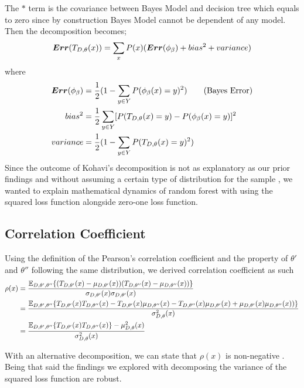 The $*$ term is the covariance between Bayes Model and decision tree which equals to zero since by construction Bayes Model cannot be dependent of any model. Then the decomposition becomes;
\begin{align}
\boldsymbol{Err}(T_{D, \theta}(x)) = \sum_{x} P(x)(\boldsymbol{Err}(\phi_{\beta}) + bias^2 + variance) \notag
\end{align}
where
\begin{align}
\boldsymbol{Err}(\phi_{\beta}) & = \dfrac{1}{2}(1 - \sum_{y \in Y}P(\phi_{\beta}(x) = y)^2)\tag{Bayes Error} \\
bias^2 & = \dfrac{1}{2}\sum_{y \in Y} [P(T_{D,\theta}(x)=y) - P(\phi_{\beta}(x) = y)]^2\notag \\
variance & = \dfrac{1}{2}(1 - \sum_{y \in Y}P(T_{D, \theta}(x) = y)^2) \notag
\end{align}
Since the outcome of Kohavi's decomposition is not as explanatory as our prior findings and without assuming a certain type of distribution for the sample \cite{louppe2014understanding}, we wanted to explain mathematical dynamics of random forest with using the squared loss function alongside zero-one loss function.

\subsection{Correlation Coefficient}
\label{app:corr_coef}
Using the definition of the Pearson's correlation coefficient and the property of $\theta'$ and $\theta''$ following the same distribution, we derived correlation coefficient as such
\begin{align}
\rho(x) & = \dfrac{\mathbb{E}_{D,\theta',\theta''}\{(T_{D,\theta'}(x) - \mu_{D,\theta'}(x))(T_{D,\theta''}(x) - \mu_{D,\theta''}(x))\} }				{\sigma_{D,\theta'}(x)\sigma_{D,\theta'}(x)}\notag \\
		& = \dfrac{\mathbb{E}_{D,\theta',\theta''}\{T_{D,\theta'}(x)T_{D,\theta''}(x) - T_{D,\theta'}(x)\mu_{D,\theta''}(x) - T_{D,								\theta''}(x)\mu_{D,\theta'}(x) + \mu_{D,\theta'}(x)\mu_{D,\theta''}(x))\} }
				{\sigma_{D,\theta}^2(x)} \notag \\
		& = \dfrac{\mathbb{E}_{D,\theta',\theta''}\{T_{D,\theta'}(x) T_{D,\theta''}(x)\} - \mu_{D,\theta}^2(x)}{\sigma_{D,\theta}^2(x)}\notag
\end{align}

With an alternative decomposition, we can state that $\rho(x)$ is non-negative 
\cite{louppe2014understanding} \cite{geurts2002contributions}. 
Being that said the findings we explored with decomposing the variance of the squared loss function are robust.

